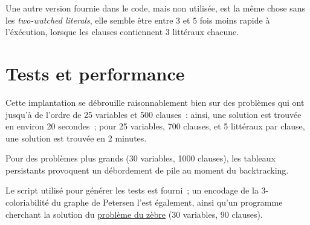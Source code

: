 \documentclass[a4paper,10pt]{article}
\begin{document}
Une autre version fournie dans le code, mais non utilisée, est la même
chose sans les \textit{two-watched literals}, elle semble être entre
$3$ et $5$ fois moins rapide à l'éxécution, lorsque les clauses
contiennent $3$ littéraux chacune.

\section{Tests et performance}

Cette implantation se débrouille raisonnablement bien sur des
problèmes qui ont jusqu'à de l'ordre de 25 variables et 500 clauses~:
ainsi, une solution est trouvée en environ 20 secondes~; pour 25
variables, 700 clauses, et 5 littéraux par clause, une solution est
trouvée en 2 minutes.

Pour des problèmes plus grands (30 variables, 1000 clauses), les
tableaux persistants provoquent un débordement de pile au moment du
backtracking.

Le script utilisé pour générer les tests est fourni~; un encodage de
la 3-coloriabilité du graphe de Petersen l'est également, ainsi qu'un
programme cherchant la solution du
\href{https://en.wikipedia.org/wiki/Zebra_Puzzle}{problème du zèbre}
(30 variables, 90 clauses).
\end{document}
